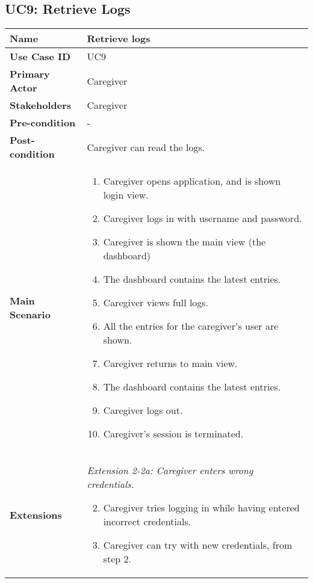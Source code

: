     \subsection{UC9: Retrieve Logs}
    \begin{tabular}{|p{}||p{}|}
        \hline
        \textbf{Name} & Retrieve logs\\
        \hline
        \textbf{Use Case ID} & UC9\\
        \hline
        \textbf{Primary Actor} & Caregiver\\
        \hline
        \textbf{Stakeholders} & Caregiver\\
        \hline
        \textbf{Pre-condition} & - \\
        \hline
        \textbf{Post-condition} & Caregiver can read the logs. \\
        \hline
        \textbf{Main Scenario} &
            \begin{enumerate}
                \item Caregiver opens application, and is shown login view.
                \item Caregiver logs in with username and password.
                \item Caregiver is shown the main view (the dashboard)
                \item The dashboard contains the latest entries.
                \item Caregiver views full logs.
                \item All the entries for the caregiver's user are shown.
                \item Caregiver returns to main view.
                \item The dashboard contains the latest entries.
                \item Caregiver logs out.
                \item Caregiver's session is terminated.
            \end{enumerate}
        \\
        \hline
        \textbf{Extensions} &
        \textit{Extension 2-2a: Caregiver enters wrong credentials.}
        
        \begin{enumerate}
            \setcounter{enumi}{1}
            \item Caregiver tries logging in while having entered incorrect credentials.
            \item Caregiver can try with new credentials, from step 2.
        \end{enumerate}\\
        \hline
    \end{tabular}

